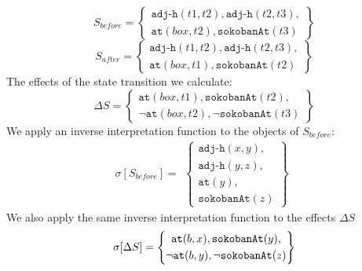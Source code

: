 \documentclass[\master/Master.tex]{subfiles}
\begin{document}
\begin{example}
	\begin{equation*}\label{eq:s_before}
		S_{before} =
		\left\{
		\begin{gathered}
			\texttt{adj-h}(t1, t2), \texttt{adj-h}(t2, t3), \\
			\texttt{at}(box,t2), \texttt{sokobanAt}(t3)
		\end{gathered}
		\right\}
	\end{equation*}
	\begin{equation*}
		S_{after} =
		\left\{
		\begin{gathered}
			\texttt{adj-h}(t1, t2), \texttt{adj-h}(t2, t3), \\
			\texttt{at}(box,t1), \texttt{sokobanAt}(t2)
		\end{gathered}
		\right\}
	\end{equation*}
	The effects of the state transition we calculate:
	\begin{equation*}
		\Delta S =
		\left\{
		\begin{gathered}
			\texttt{at}(box, t1), \texttt{sokobanAt}(t2), \\
			\neg\texttt{at}(box,t2), \neg\texttt{sokobanAt}(t3)
		\end{gathered}
		\right\}
	\end{equation*}
	We apply an inverse interpretation function to the objects of $S_{before}$:
	\begin{equation*}
		\sigma[S_{before}] =
		\begin{gathered}
			\left\{
			\begin{gathered}
				\texttt{adj-h}(x, y), \\
				\texttt{adj-h}(y, z), \\
				\texttt{at}(y), \\
				\texttt{sokobanAt}(z)
			\end{gathered}
			\right\}
		\end{gathered}
	\end{equation*}
	We also apply the same inverse interpretation function to the effects $\Delta S$
	\begin{equation*}
		\sigma[\Delta S] =
		\left\{
		\begin{gathered}
			\texttt{at}(b,x),
			\texttt{sokobanAt}(y), \\
			\neg\texttt{at}(b,y),
			\neg\texttt{sokobanAt}(z)
		\end{gathered}
		\right\}
	\end{equation*}
	

\end{example}
\end{document}
